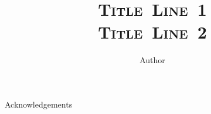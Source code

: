 \documentclass[11pt]{mvlthesis}
\title{\scshape \mbox{Title Line 1}\\
\scshape \mbox{Title Line 2}}
\author{Author}
\begin{document}
\maketitle
\begin{abstract}



\end{abstract}

\begin{frontmatter}

\begin{acknowledgements}
\begin{center}
\vspace{0.4in}
Acknowledgements
\end{center}
\end{acknowledgements}

\tableofcontents
\listoffigures
\listoftables

\end{frontmatter}











\appendix
\end{document}
